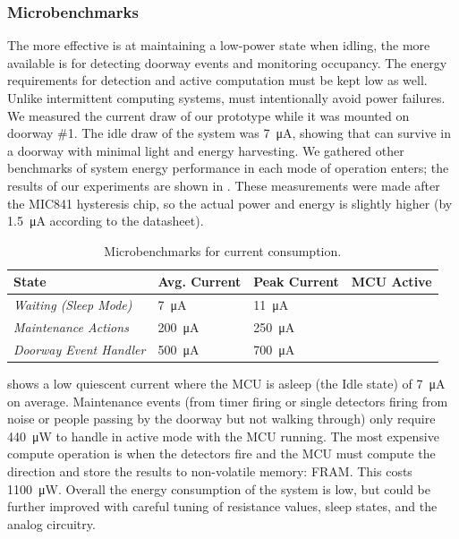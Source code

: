 \subsubsection{Microbenchmarks}
\label{sec:microbenchmarks}
The more effective \sysname is at maintaining a low-power state when idling, the more available \sysname is for detecting doorway events and monitoring occupancy.
The energy requirements for detection and active computation must be kept low as well.
Unlike intermittent computing systems, \sysname must intentionally avoid power failures.
We measured the current draw of our \sysname prototype while it was mounted on doorway \#1.
The idle draw of the system was \SI{7}{\micro\ampere}, showing that \sysname can survive in a doorway with minimal light and energy harvesting.
We gathered other benchmarks of system energy performance in each mode of operation \sysname enters; the results of our experiments are shown in . These measurements were made after the MIC841 hysteresis chip, so the actual power and energy is slightly higher (by \SI{1.5}{\micro\ampere} according to the datasheet).


%
\begin{table}[t]
\footnotesize
\begin{tabular}{@{}p{1.4in}llc@{}}
\toprule
\textbf{State}          & \multicolumn{1}{r}{\textbf{Avg. Current}} & \multicolumn{1}{r}{\textbf{Peak Current}} & \multicolumn{1}{r}{\textbf{MCU Active}} \\ \midrule
\textit{Waiting (Sleep Mode)}       	& \SI{7}{\micro\ampere}	&  \SI{11}{\micro\ampere}	& \textcolor{magenta}{\xmark} \\
\textit{Maintenance Actions} & \SI{200}{\micro\ampere}	& \SI{250}{\micro\ampere}		 & \textcolor{green}{\cmark} \\
\textit{Doorway Event Handler} & \SI{500}{\micro\ampere}	& \SI{700}{\micro\ampere}	    & \textcolor{green}{\cmark} \\ \midrule
\end{tabular}
\caption{Microbenchmarks for \sysname current consumption.}
\label{tab:microbenchmarks}
\end{table}


 shows a low quiescent current where the MCU is asleep (the Idle state) of \SI{7}{\micro\ampere} on average. Maintenance events (from timer firing or single detectors firing from noise or people passing by the doorway but not walking through) only require \SI{440}{\micro\watt} to handle in active mode with the MCU running.
The most expensive compute operation is when the detectors fire and the MCU must compute the direction and store the results to non-volatile memory: FRAM. This costs \SI{1100}{\micro\watt}.
Overall the energy consumption of the system is low, but could be further improved with careful tuning of resistance values, sleep states, and the analog circuitry.







